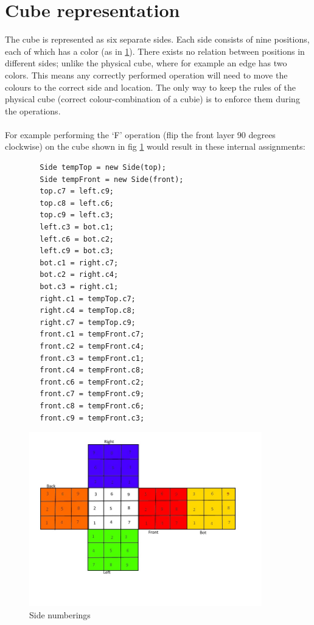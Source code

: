 \documentclass[a4paper,11pt]{kth-mag}
\begin{document}
\section{Cube representation}
 The cube is represented as six separate sides. Each side consists of nine positions, each of which has a color (as in \ref{fig_17}). There exists no relation between positions in different sides; unlike the physical cube, where for example an edge has two colors. This means any correctly performed operation will need to move the colours to the correct side and location. The only way to keep the rules of the physical cube (correct colour-combination of a cubie) is to enforce them during the operations.\\\\
 For example performing the `F' operation (flip the front layer 90 degrees clockwise) on the cube shown in fig \ref{fig_17} would result in these internal assignments:
 \begin{verbatim}
		Side tempTop = new Side(top);
		Side tempFront = new Side(front);
		top.c7 = left.c9;
		top.c8 = left.c6;
		top.c9 = left.c3;
		left.c3 = bot.c1;
		left.c6 = bot.c2;
		left.c9 = bot.c3;
		bot.c1 = right.c7;
		bot.c2 = right.c4;
		bot.c3 = right.c1;
		right.c1 = tempTop.c7;
		right.c4 = tempTop.c8;
		right.c7 = tempTop.c9;
		front.c1 = tempFront.c7;
		front.c2 = tempFront.c4;
		front.c3 = tempFront.c1;
		front.c4 = tempFront.c8;
		front.c6 = tempFront.c2;
		front.c7 = tempFront.c9;
		front.c8 = tempFront.c6;
		front.c9 = tempFront.c3;
\end{verbatim}
\begin{figure}[b]
	\centering
	\includegraphics[width= 0.9\textwidth]{figs/cubeorder.jpg}
	\caption{Side numberings}
	\label{fig_17}
\end{figure}  
\end{document}
